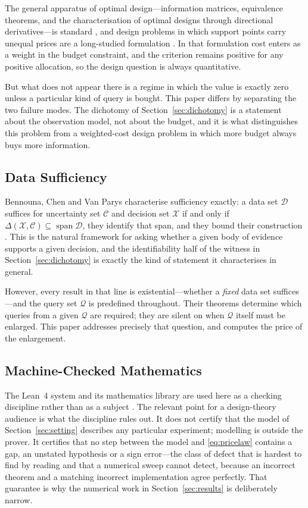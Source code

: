 The general apparatus of optimal design---information matrices, equivalence theorems, and
the characterisation of optimal designs through directional derivatives---is standard
\cite{pukelsheim2006,silvey1980}, and design problems in which support points carry unequal
prices are a long-studied formulation \cite{stigler1971}. In that formulation cost enters as
a weight in the budget constraint, and the criterion remains positive for any positive
allocation, so the design question is always quantitative.

But what does not appear there is a regime in which the value is exactly zero unless a
particular kind of query is bought. This paper differs by separating the two failure modes.
The dichotomy of Section~\ref{sec:dichotomy} is a statement about the observation model,
not about the budget, and it is what distinguishes this problem from a weighted-cost design
problem in which more budget always buys more information.

\subsection{Data Sufficiency}

Bennouna, Chen and Van Parys characterise sufficiency exactly: a data set $\mathcal{D}$
suffices for uncertainty set $\mathcal{C}$ and decision set $\mathcal{X}$ if and only if
$\Delta(\mathcal{X},\mathcal{C})\subseteq\operatorname{span}\mathcal{D}$, they identify that
span, and they bound their construction \cite{bennouna2025}. This is the natural framework
for asking whether a given body of evidence supports a given decision, and the
identifiability half of the witness in Section~\ref{sec:dichotomy} is exactly the kind of
statement it characterises in general.

However, every result in that line is existential---whether a \emph{fixed} data set
suffices---and the query set $\mathcal{Q}$ is predefined throughout. Their theorems
determine which queries from a given $\mathcal{Q}$ are required; they are silent on when
$\mathcal{Q}$ itself must be enlarged. This paper addresses precisely that question, and
computes the price of the enlargement.

\subsection{Machine-Checked Mathematics}

The Lean~4 system and its mathematics library are used here as a checking discipline rather
than as a subject \cite{demoura2021,mathlib2020}. The relevant point for a design-theory
audience is what the discipline rules out. It does not certify that the model of
Section~\ref{sec:setting} describes any particular experiment; modelling is outside the
prover. It certifies that no step between the model and \eqref{eq:pricelaw} contains a gap,
an unstated hypothesis or a sign error---the class of defect that is hardest to find by
reading and that a numerical sweep cannot detect, because an incorrect theorem and a
matching incorrect implementation agree perfectly. That guarantee is why the numerical work
in Section~\ref{sec:results} is deliberately narrow.

